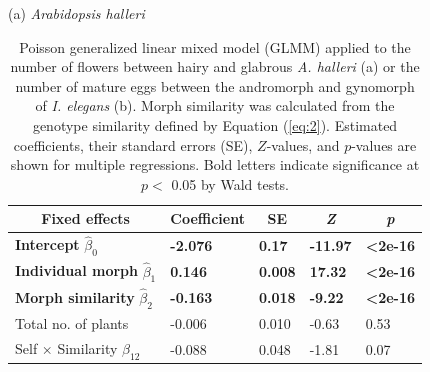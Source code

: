\documentclass[12pt,]{article}
\begin{document}
\begin{table}[ht]
\caption{Poisson generalized linear mixed model (GLMM) applied to the number of flowers between hairy and glabrous \textit{A. halleri} (a) or the number of mature eggs between the andromorph and gynomorph of \textit{I. elegans} (b). Morph similarity was calculated from the genotype similarity defined by Equation (\ref{eq:2}). Estimated coefficients, their standard errors (SE), $Z$-values, and $p$-values are shown for multiple regressions. Bold letters indicate significance at $p <$ 0.05 by Wald tests.}
(a) \textit{Arabidopsis halleri} \\
\begin{tabular}{lllll}
\hline
\multicolumn{1}{c}{Fixed effects} & \multicolumn{1}{c}{Coefficient} & \multicolumn{1}{c}{SE} & \multicolumn{1}{c}{\textit{Z}} & \multicolumn{1}{c}{\textit{p}} \\ \hline
\textbf{Intercept} $\hat{\beta}_{0}$    & \textbf{-2.076}  &  \textbf{0.17} & \textbf{-11.97} & \textbf{\textless{}2e-16}  \\
\textbf{Individual morph} $\hat{\beta}_{1}$      & \textbf{0.146}                  & \textbf{0.008}         & \textbf{17.32}                 & \textbf{\textless{}2e-16}      \\
\textbf{Morph similarity} $\hat{\beta}_{2}$        & \textbf{-0.163}                 & \textbf{0.018}         & \textbf{-9.22}                 & \textbf{\textless{}2e-16}      \\
Total no. of plants               & -0.006                          & 0.010                  & -0.63                          & 0.53                           \\
Self $\times$ Similarity $\hat{\beta}_{12}$            & -0.088                          & 0.048                  & -1.81                          & 0.07                           \\ \hline
\end{tabular}

\vspace*{5mm}


\end{table}
\end{document}
